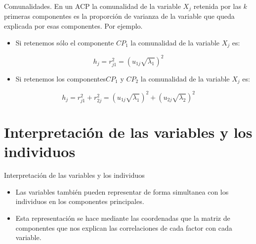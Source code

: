 \documentclass[
  ignorenonframetext,
]{beamer}
\providecommand{\tightlist}{%
  \setlength{\itemsep}{0pt}\setlength{\parskip}{0pt}}
\begin{document}
\begin{frame}{Comunalidades.}
\label{comunalidades.}
En un ACP la comunalidad de la variable \(X_j\) retenida por las \(k\)
primeras componentes es la proporción de varianza de la variable que
queda explicada por esas componentes. Por ejemplo.

\begin{itemize}
\tightlist
\item
  Si retenemos sólo el componente \(CP_1\) la comunalidad de la variable
  \(X_j\) es:
\end{itemize}

\[h_j=r_{j 1}^2=\left( u_{1 j}\sqrt{\lambda_1}\right)^2\]

\begin{itemize}
\tightlist
\item
  Si retenemos los componentes\(CP_1\) y \(CP_2\) la comunalidad de la
  variable \(X_j\) es:
\end{itemize}

\[h_j=r_{j 1}^2+r_{2 j}^2=\left( u_{1 j}\sqrt{\lambda_1}\right)^2+
\left( u_{2 j}\sqrt{\lambda_2}\right)^2\]
\end{frame}

\section{Interpretación de las variables y los
individuos}\label{interpretaciuxf3n-de-las-variables-y-los-individuos}

\begin{frame}{Interpretación de las variables y los individuos}
\label{interpretaciuxf3n-de-las-variables-y-los-individuos-1}
\begin{itemize}
\item
  Las variables también pueden representar de forma simultanea con los
  individuos en los componentes principales.
\item
  Esta representación se hace mediante las coordenadas que la matriz de
  componentes que nos explican las correlaciones de cada factor con cada
  variable.
\end{itemize}
\end{frame}
\end{document}
